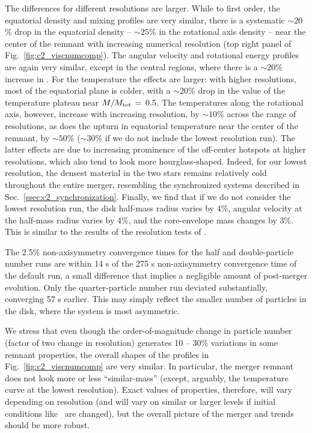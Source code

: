 The differences for different resolutions are larger.  While to first order, the equatorial density and mixing profiles are very similar, there is a systematic $\sim\!20$\% drop in the equatorial density -- $\sim\!25$\% in the rotational axis density -- near the center of the remnant with increasing numerical resolution (top right panel of Fig.~\ref{fig:c2_viscnumcomp}).  The angular velocity and rotational energy profiles are again very similar, except in the central regions, where there is a $\sim\!20$\% increase in \Omegamax.  For the temperature the effects are larger: with higher resolutions, most of the equatorial plane is colder, with a $\sim20\!$\% drop in the value of the temperature plateau near $M/M_\mathrm{tot}\,=\,0.5$.  The temperatures along the rotational axis, however, increase with increasing resolution, by $\sim\!10$\% across the range of resolutions, as does the upturn in equatorial temperature near the center of the remnant, by $\sim\!50$\% ($\sim\!30$\% if we do not include the lowest resolution run).  The latter effects are due to increasing prominence of the off-center hotspots at higher resolutions, which also tend to look more hourglass-shaped.  Indeed, for our lowest resolution, the densest material in the two stars remains relatively cold throughout the entire merger, resembling the synchronized systems described in Sec.~\ref{ssec:c2_synchronization}.  Finally, we find that if we do not consider the lowest resolution run, the disk half-mass radius varies by 4\%, angular velocity at the half-mass radius varies by 4\%, and the core-envelope mass changes by 3\%.  This is similar to the results of the resolution tests of \cite{rask+12}.


The 2.5\% non-axisymmetry convergence times for the half and double-particle number runs are within 14 s of the 275 s non-axisymmetry convergence time of the default run, a small difference that implies a negligible amount of post-merger evolution.  Only the quarter-particle number run deviated substantially, converging 57 s earlier.  This may simply reflect the smaller number of particles in the disk, where the system is most asymmetric.

We stress that even though the order-of-magnitude change in particle number (factor of two change in resolution) generates 10 -- 30\% variations in some remnant properties, the overall shapes of the profiles in Fig.~\ref{fig:c2_viscnumcomp} are very similar.  In particular, the merger remnant does not look more or less ``similar-mass'' (except, arguably, the temperature curve at the lowest resolution).  Exact values of properties, therefore, will vary depending on resolution (and will vary on similar or larger levels if initial conditions like \azero\ are changed), but the overall picture of the merger and trends should be more robust.

